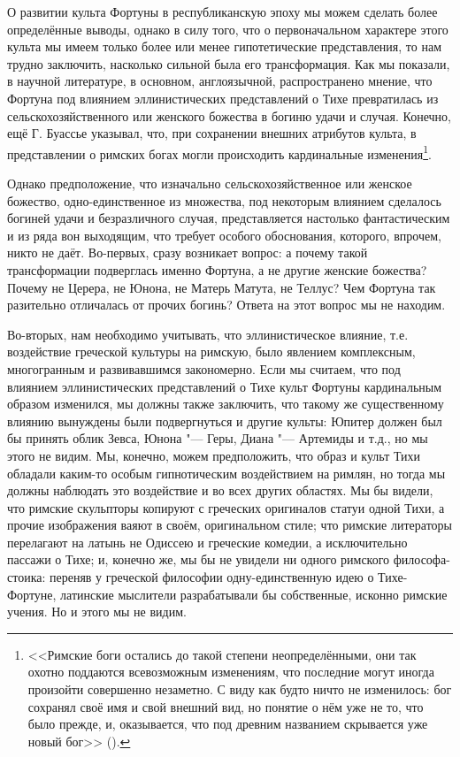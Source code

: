 
О развитии культа Фортуны в республиканскую эпоху мы можем сделать более определённые выводы, однако в силу того, что о первоначальном характере этого культа мы имеем только более или менее гипотетические представления, то нам трудно заключить, насколько сильной была его трансформация. Как мы показали, в научной литературе, в основном, англоязычной, распространено мнение, что Фортуна под влиянием эллинистических представлений о Тихе превратилась из сельскохозяйственного или женского божества в богиню удачи и случая. Конечно, ещё Г. Буассье указывал, что, при сохранении внешних атрибутов культа, в представлении о римских богах могли происходить кардинальные изменения\footnote{<<Римские боги остались до такой степени неопределёнными, они так охотно поддаются всевозможным изменениям, что последние могут иногда произойти совершенно незаметно. С виду как будто ничто не изменилось: бог сохранял своё имя и свой внешний вид, но понятие о нём уже не то, что было прежде, и, оказывается, что под древним названием скрывается уже новый бог>> (\cite[С. 361]{Boissier1914}).}.


Однако предположение, что изначально сельскохозяйственное или женское божество, одно-единственное из множества, под некоторым влиянием сделалось богиней удачи и безразличного случая, представляется настолько фантастическим и из ряда вон выходящим, что требует особого обоснования, которого, впрочем, никто не даёт. Во-первых, сразу возникает вопрос: а почему такой трансформации подверглась именно Фортуна, а не другие женские божества? Почему не Церера, не Юнона, не Матерь Матута, не Теллус? Чем Фортуна так разительно отличалась от прочих богинь? Ответа на этот вопрос мы не находим.

Во-вторых, нам необходимо учитывать, что эллинистическое влияние, т.е. воздействие греческой культуры на римскую, было явлением комплексным, многогранным и развивавшимся закономерно. Если мы считаем, что под влиянием эллинистических представлений о Тихе культ Фортуны кардинальным образом изменился, мы должны также заключить, что такому же существенному влиянию вынуждены были подвергнуться и другие культы: Юпитер должен был бы принять облик Зевса, Юнона "--- Геры, Диана "--- Артемиды и т.д., но мы этого не видим. Мы, конечно, можем предположить, что образ и культ Тихи обладали каким-то особым гипнотическим воздействием на римлян, но тогда мы должны наблюдать это воздействие и во всех других областях. Мы бы видели, что римские скульпторы копируют с греческих оригиналов статуи одной Тихи, а прочие изображения ваяют в своём, оригинальном стиле; что римские литераторы перелагают на латынь не Одиссею и греческие комедии, а исключительно пассажи о Тихе; и, конечно же, мы бы не увидели ни одного римского философа-стоика: переняв у греческой философии одну-единственную идею о Тихе-Фортуне, латинские мыслители разрабатывали бы собственные, исконно римские учения. Но и этого мы не видим.

